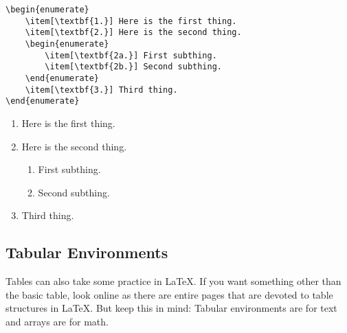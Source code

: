 \documentclass[letterpaper,twoside,10pt]{article}
\begin{document}
\begin{multicols}{2}
{\small\begin{verbatim}
\begin{enumerate}
    \item[\textbf{1.}] Here is the first thing.
    \item[\textbf{2.}] Here is the second thing.
    \begin{enumerate}
        \item[\textbf{2a.}] First subthing.
        \item[\textbf{2b.}] Second subthing.
    \end{enumerate}
    \item[\textbf{3.}] Third thing.
\end{enumerate}
\end{verbatim}}
\begin{enumerate}
    \item[\textbf{1.}] Here is the first thing.
    \item[\textbf{2.}] Here is the second thing.
    \begin{enumerate}
        \item[\textbf{2a.}] First subthing.
        \item[\textbf{2b.}] Second subthing.
    \end{enumerate}
    \item[\textbf{3.}] Third thing.
\end{enumerate}
\end{multicols}


\subsection{Tabular Environments}

Tables can also take some practice in {\LaTeX}. If you want something other than the basic table,
look online as there are entire pages that are devoted to table structures in {\LaTeX}. But keep
this in mind: Tabular environments are for text and arrays are for math.
\end{document}
